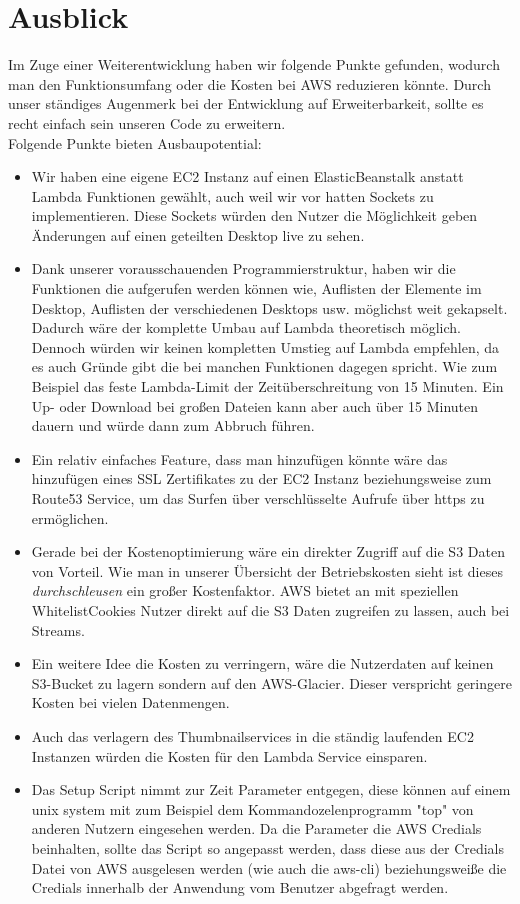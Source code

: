 \documentclass[a4paper, 12pt]{scrreprt}
\renewcommand\_{\textunderscore\allowbreak}
\begin{document}
\chapter{Ausblick}
Im Zuge einer Weiterentwicklung haben wir folgende Punkte gefunden, wodurch man den Funktionsumfang oder die Kosten bei AWS reduzieren könnte. Durch unser ständiges Augenmerk bei der Entwicklung auf Erweiterbarkeit, sollte es recht einfach sein unseren Code zu erweitern. \\
Folgende Punkte bieten Ausbaupotential:
\begin{itemize}
\item Wir haben eine eigene EC2 Instanz auf einen ElasticBeanstalk anstatt Lambda Funktionen gewählt, auch weil wir vor hatten Sockets zu implementieren. Diese Sockets würden den Nutzer die Möglichkeit geben Änderungen auf einen geteilten Desktop live zu sehen. 
\item Dank unserer vorausschauenden Programmierstruktur, haben wir die Funktionen die aufgerufen werden können wie, Auflisten der Elemente im Desktop, Auflisten der verschiedenen Desktops usw. möglichst weit gekapselt. Dadurch wäre der komplette Umbau auf Lambda theoretisch möglich. Dennoch würden wir keinen kompletten Umstieg auf Lambda empfehlen, da es auch Gründe gibt die bei manchen Funktionen dagegen spricht. Wie zum Beispiel das feste Lambda-Limit der Zeitüberschreitung von 15 Minuten. Ein Up- oder Download bei großen Dateien kann aber auch über 15 Minuten dauern und würde dann zum Abbruch führen.
\item Ein relativ einfaches Feature, dass man hinzufügen könnte wäre das hinzufügen eines SSL Zertifikates zu der EC2 Instanz beziehungsweise zum Route53 Service, um das Surfen über verschlüsselte Aufrufe über https zu ermöglichen. 
\item Gerade bei der Kostenoptimierung wäre ein direkter Zugriff auf die S3 Daten von Vorteil. Wie man in unserer Übersicht der Betriebskosten sieht ist dieses \emph{durchschleusen} ein großer Kostenfaktor. AWS bietet an mit speziellen \glqq Whitelist\grqq  Cookies Nutzer direkt auf die S3 Daten zugreifen zu lassen, auch bei Streams.
\item Ein weitere Idee die Kosten zu verringern, wäre die Nutzerdaten auf keinen S3-Bucket zu lagern sondern auf den AWS-Glacier. Dieser verspricht geringere Kosten bei vielen Datenmengen.
\item Auch das verlagern des Thumbnailservices in die ständig laufenden EC2 Instanzen würden die Kosten für den Lambda Service einsparen.
\item Das Setup Script nimmt zur Zeit Parameter entgegen, diese können auf einem unix system mit zum Beispiel dem Kommandozelenprogramm "top" von anderen Nutzern eingesehen werden. Da die Parameter die AWS Credials beinhalten, sollte das Script so angepasst werden, dass diese aus der Credials Datei von AWS ausgelesen werden (wie auch die aws-cli) beziehungsweiße die Credials innerhalb der Anwendung vom Benutzer abgefragt werden.
\end{itemize}


\clearpage


%
\end{document}
